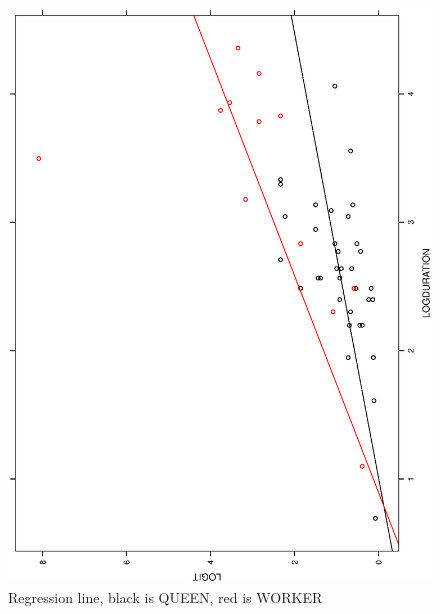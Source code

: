 \documentclass[a4paper,10pt]{article}
\begin{document}
\begin{figure}
\includegraphics[angle=-90, width=1\textwidth]{figures/math650_hw7_fig4.eps}
\caption{Regression line, black is QUEEN, red is WORKER}\label{f4}
\end{figure}
\end{document}
